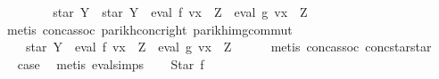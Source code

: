 \begin{isabellebody}
\ \ \isamarkupfalse%
\ \isamarkupfalse%
\ {\isachardoublequoteopen}{\isasymdots}\ {\isacharequal}{\kern0pt}\ {\isasymPsi}\ {\isacharparenleft}{\kern0pt}star\ Y\ {\isacharat}{\kern0pt}{\isacharat}{\kern0pt}\ star\ Y\ {\isacharat}{\kern0pt}{\isacharat}{\kern0pt}\ eval\ f\ {\isacharparenleft}{\kern0pt}v{\isacharparenleft}{\kern0pt}x\ {\isacharcolon}{\kern0pt}{\isacharequal}{\kern0pt}\ Z{\isacharparenright}{\kern0pt}{\isacharparenright}{\kern0pt}\ {\isacharat}{\kern0pt}{\isacharat}{\kern0pt}\ eval\ g\ {\isacharparenleft}{\kern0pt}v{\isacharparenleft}{\kern0pt}x\ {\isacharcolon}{\kern0pt}{\isacharequal}{\kern0pt}\ Z{\isacharparenright}{\kern0pt}{\isacharparenright}{\kern0pt}{\isacharparenright}{\kern0pt}{\isachardoublequoteclose}\isanewline
\ \ \ \ \isamarkupfalse%
\ {\isacharparenleft}{\kern0pt}metis\ conc{\isacharunderscore}{\kern0pt}assoc\ parikh{\isacharunderscore}{\kern0pt}conc{\isacharunderscore}{\kern0pt}right\ parikh{\isacharunderscore}{\kern0pt}img{\isacharunderscore}{\kern0pt}commut{\isacharparenright}{\kern0pt}\isanewline
\ \ \isamarkupfalse%
\ \isamarkupfalse%
\ {\isachardoublequoteopen}{\isasymdots}\ {\isacharequal}{\kern0pt}\ {\isasymPsi}\ {\isacharparenleft}{\kern0pt}star\ Y\ {\isacharat}{\kern0pt}{\isacharat}{\kern0pt}\ eval\ f\ {\isacharparenleft}{\kern0pt}v{\isacharparenleft}{\kern0pt}x\ {\isacharcolon}{\kern0pt}{\isacharequal}{\kern0pt}\ Z{\isacharparenright}{\kern0pt}{\isacharparenright}{\kern0pt}\ {\isacharat}{\kern0pt}{\isacharat}{\kern0pt}\ eval\ g\ {\isacharparenleft}{\kern0pt}v{\isacharparenleft}{\kern0pt}x\ {\isacharcolon}{\kern0pt}{\isacharequal}{\kern0pt}\ Z{\isacharparenright}{\kern0pt}{\isacharparenright}{\kern0pt}{\isacharparenright}{\kern0pt}{\isachardoublequoteclose}\isanewline
\ \ \ \ \isamarkupfalse%
\ {\isacharparenleft}{\kern0pt}metis\ conc{\isacharunderscore}{\kern0pt}assoc\ conc{\isacharunderscore}{\kern0pt}star{\isacharunderscore}{\kern0pt}star{\isacharparenright}{\kern0pt}\isanewline
\ \ \isamarkupfalse%
\ \isamarkupfalse%
\ {\isacharquery}{\kern0pt}case\ \isamarkupfalse%
\ {\isacharparenleft}{\kern0pt}metis\ eval{\isachardot}{\kern0pt}simps{\isacharparenleft}{\kern0pt}{}{\isacharparenright}{\kern0pt}{\isacharparenright}{\kern0pt}\isanewline
{}\isamarkupfalse%
\isanewline
\ \ \isamarkupfalse%
\ {\isacharparenleft}{\kern0pt}Star\ f{\isacharparenright}{\kern0pt}\isanewline
\ \ \isamarkupfalse%

\end{isabellebody}
